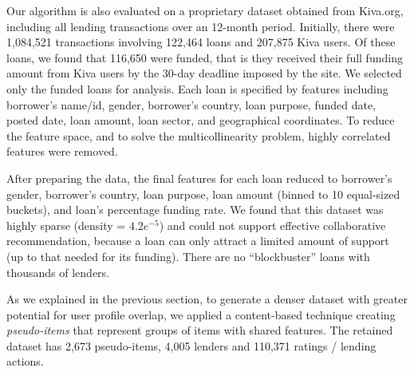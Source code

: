 Our algorithm is also evaluated on a proprietary dataset obtained from Kiva.org, including all lending transactions over an 12-month period. Initially, there were 1,084,521 transactions involving 122,464 loans and 207,875 Kiva users. Of these loans, we found that 116,650 were funded, that is they received their full funding amount from Kiva users by the 30-day deadline imposed by the site. We selected only the funded loans for analysis. Each loan is specified by features including borrower's name/id, gender, borrower's country, loan purpose, funded date, posted date, loan amount, loan sector, and geographical coordinates. To reduce the feature space, and to solve the multicollinearity problem, highly correlated features were removed. 



After preparing the data, the final features for each loan reduced to borrower's gender, borrower's country, loan purpose, loan amount (binned to 10 equal-sized buckets), and loan's percentage funding rate. We found that this dataset was highly sparse (density = $4.2e^{-5}$) and could not support effective collaborative recommendation, because a loan can only attract a limited amount of support (up to that needed for its funding). There are no ``blockbuster'' loans with thousands of lenders.

As we explained in the previous section, to generate a denser dataset with greater potential for user profile overlap, we applied a content-based technique creating \textit{pseudo-items} that represent groups of items with shared features. The retained dataset has 2,673 pseudo-items, 4,005 lenders and 110,371 ratings / lending actions.


